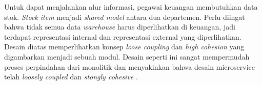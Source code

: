 \begin{adjustbox}{width=1\textwidth}
	\centering
	\begin{minipage}{\linewidth}
	\end{minipage}
\end{adjustbox}

Untuk dapat menjalankan alur informasi, pegawai keuangan membutuhkan data stok. \textit{Stock item} menjadi \textit{shared model} antara dua departemen. Perlu diingat bahwa tidak semua data \textit{warehouse} harus diperlihatkan di keuangan, jadi terdapat representasi internal dan representasi external yang diperlihatkan. Desain diatas memperlihatkan konsep \textit{loose coupling} dan \textit{high cohesion} yang digambarkan menjadi sebuah modul. Desain seperti ini sangat mempermudah proses perpindahan dari monolitik dan menyakinkan bahwa desain microservice telah \textit{loosely coupled} dan \textit{stongly cohesive} \cite{9}.

